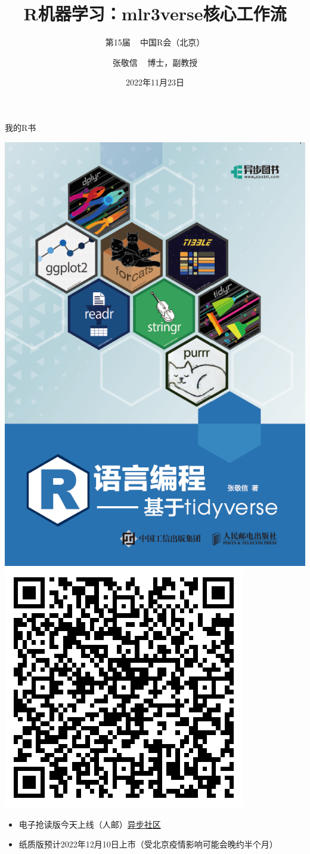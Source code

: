 \documentclass[
  11pt,
  ignorenonframetext,
  dvipsnames,UTF8]{beamer}
\title{R机器学习：mlr3verse核心工作流}
\subtitle{第15届 ~ 中国R会（北京）}
\author{张敬信 ~ 博士，副教授}
\date{2022年11月23日}
\institute{哈尔滨商业大学 ~ 数学与应用数学系}
\providecommand{\tightlist}{%
  \setlength{\itemsep}{0pt}\setlength{\parskip}{0pt}}
\begin{document}
\frame{\titlepage}

\begin{frame}{我的R书}
\protect\hypertarget{ux6211ux7684rux4e66}{}
\begin{center}\includegraphics[width=0.4\linewidth]{images/myRbook} \includegraphics[width=0.25\linewidth]{images/QR_code} \end{center}

\begin{itemize}
\tightlist
\item
  电子抢读版今天上线（人邮）\href{https://www.epubit.com/bookDetails?id=UB7db2c0db9f537\&tabName=\%E6\%8A\%A2\%E8\%AF\%BB\%E7\%89\%88\&floorName=\%E7\%B2\%BE\%E9\%80\%89\%E7\%BA\%B8\%E4\%B9\%A6}{异步社区}
\item
  纸质版预计2022年12月10日上市（受北京疫情影响可能会晚约半个月）
\end{itemize}
\end{frame}
\end{document}
